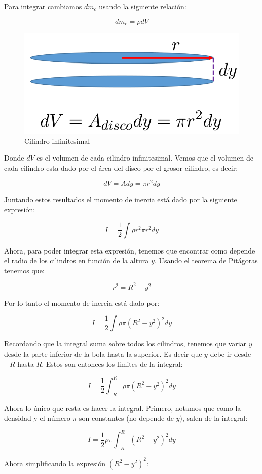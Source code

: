 \documentclass[a4paper,11pt]{article}
\theoremstyle{mytheor}
\begin{document}
 Para integrar cambiamos $dm_c$ usando la siguiente relación:


$$ dm_c = \rho dV$$



\begin{figure}[h]
	\includegraphics[width=0.7\linewidth]{elmentovolbola}
	\caption{Cilindro infinitesimal}
	\label{fcN4}
\end{figure}

Donde $dV$ es el volumen de cada cilindro infinitesimal. Vemos que el volumen de cada cilindro esta dado por el área del disco por el grosor cilindro, es decir:

$$ dV = A dy = \pi r^2 d y$$

 Juntando estos resultados el momento de inercia está dado por la siguiente expresión:
 
 $$ I = \frac{1}{2} \int \rho r^2 \pi r^2 dy$$

Ahora, para poder integrar esta expresión, tenemos que encontrar como depende el radio de los cilindros en función de la altura $y$. Usando el teorema de Pitágoras tenemos que:

$$ r^2 = R^2 - y^2$$

Por lo tanto el momento de inercia está dado por:

 $$ I = \frac{1}{2} \int \rho \pi   (R^2-y^2)^2 dy$$

Recordando que la integral suma sobre todos los cilindros, tenemos que variar $y$ desde la parte inferior de la bola hasta la superior. Es decir que $y$ debe ir desde $-R$ hasta $R$. Estos son entonces los limites de la integral:


$$ I = \frac{1}{2} \int_{-R}^{R} \rho \pi   (R^2-y^2)^2 dy$$

Ahora lo único que resta es hacer la integral. Primero, notamos que como la densidad y el número $\pi$ son constantes (no depende de $y$), salen de la integral:


$$ I = \frac{1}{2} \rho \pi \int_{-R}^{R}    (R^2-y^2)^2 dy$$

Ahora simplificando la expresión $(R^2-y^2)^2$:
\end{document}
